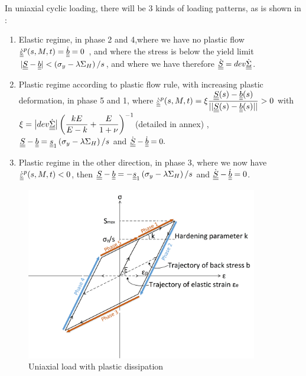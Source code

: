 In uniaxial cyclic loading, there will be 3 kinds of loading patterns, as is shown in :

\vspace{6pt}
\begin{enumerate}

\item	Elastic regime, in phase 2 and 4,where we have no plastic flow $\dot{\uline{\uline{\varepsilon}}}^p(s,M,t)=\dot{\uline{\uline{b}}}=0$ ,  and where the stress is below the yield limit $|\uline{\uline{S}}-\uline{\uline{b}}|< \left( \sigma_y-\lambda \Sigma_H\right)/s$, and where we have therefore $\dot{\uline{\uline{S}}}=dev\dot{\uline{\uline{\Sigma}}}$. 
\vspace{6pt}

\item Plastic regime according to plastic flow rule, with increasing plastic deformation, in phase 5 and 1, where	$\dot{\uline{\uline{\varepsilon}}}^p(s,M,t)=\xi\dfrac{\uline{\uline{S}}(s)-\uline{\uline{b}}(s)}{||\uline{\uline{S}}(s)-\uline{\uline{b}}(s)||}> 0$ with  $\xi= \left| dev\dot{\uline{\uline{\Sigma}}}\right| \left(\dfrac{kE}{E-k}+\dfrac{E}{1+\nu} \right) ^{-1}$(detailed in annex) ,  $\uline{\uline{S}}-\uline{\uline{b}}=\uline{\uline{s}}_1 \left(\sigma_y-\lambda \Sigma_H\right)/s$ and $\dot{\uline{\uline{S}}}-\dot{\uline{\uline{b}}}=0.$ 
\vspace{6pt}

\item Plastic regime in the other direction, in phase 3, where we now have	$\dot{\uline{\uline{\varepsilon}}}^p(s,M,t)<0$,  then $\uline{\uline{S}}-\uline{\uline{b}}=-\uline{\uline{s}}_1 \left(\sigma_y-\lambda \Sigma_H\right)/s$ and $\dot{\uline{\uline{S}}}-\dot{\uline{\uline{b}}}=0$.

\end{enumerate}	

\begin{figure}[!h]
\centering
\includegraphics[width=0.9\textwidth]{figures//backstress.png} 
\caption{Uniaxial load with plastic dissipation}
\label{backstress}
\end{figure}

